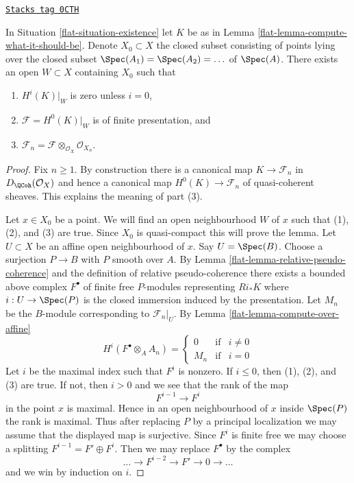 \begin{lemma}
\label{flat-lemma-finitely-presented}
\href{https://stacks.math.columbia.edu/tag/0CTH}{\texttt{Stacks tag 0CTH}}

In Situation \ref{flat-situation-existence} let $K$ be as in
Lemma \ref{flat-lemma-compute-what-it-should-be}.
Denote $X_0 \subset X$ the closed subset
consisting of points lying over the closed subset
$\Spec(A_1) = \Spec(A_2) = \ldots$ of $\Spec(A)$.
There exists an open $W \subset X$ containing $X_0$
such that
\begin{enumerate}
\item $H^i(K)|_W$ is zero unless $i = 0$,
\item $\mathcal{F} = H^0(K)|_W$ is of finite presentation, and
\item $\mathcal{F}_n = \mathcal{F} \otimes_{\mathcal{O}_X} \mathcal{O}_{X_n}$.
\end{enumerate}
\end{lemma}

\begin{proof}

Fix $n \geq 1$. By construction there is a canonical map
$K \to \mathcal{F}_n$ in $D_\QCoh(\mathcal{O}_X)$
and hence a canonical map $H^0(K) \to \mathcal{F}_n$
of quasi-coherent sheaves. This explains the meaning of part (3).

\medskip\noindent
Let $x \in X_0$ be a point.
We will find an open neighbourhood $W$
of $x$ such that (1), (2), and (3) are true. Since $X_0$ is quasi-compact
this will prove the lemma. Let $U \subset X$ be an affine open
neighbourhood of $x$. Say $U = \Spec(B)$.
Choose a surjection $P \to B$ with $P$ smooth over $A$.
By Lemma \ref{flat-lemma-relative-pseudo-coherence}
and the definition of relative pseudo-coherence
there exists a bounded above complex $F^\bullet$
of finite free $P$-modules representing
$Ri_*K$ where $i : U \to \Spec(P)$ is the closed
immersion induced by the presentation.
Let $M_n$ be the $B$-module corresponding to $\mathcal{F}_n|_U$.
By Lemma \ref{flat-lemma-compute-over-affine}
$$
H^i(F^\bullet \otimes_A A_n) =
\left\{
\begin{matrix}
0 & \text{if} & i \not = 0 \\
M_n & \text{if} & i = 0
\end{matrix}
\right.
$$
Let $i$ be the maximal index such that $F^i$ is nonzero.
If $i \leq 0$, then (1), (2), and (3) are true.
If not, then $i > 0$ and we see that the rank of the map
$$
F^{i - 1} \to F^i
$$
in the point $x$ is maximal. Hence in an open neighbourhood
of $x$ inside $\Spec(P)$ the rank is maximal. Thus after replacing
$P$ by a principal localization we may assume that the displayed
map is surjective. Since $F^i$ is finite free we may choose
a splitting $F^{i - 1} = F' \oplus F^i$. Then we may
replace $F^\bullet$ by the complex
$$
\ldots \to F^{i - 2} \to F' \to 0 \to \ldots
$$
and we win by induction on $i$.
\end{proof}

